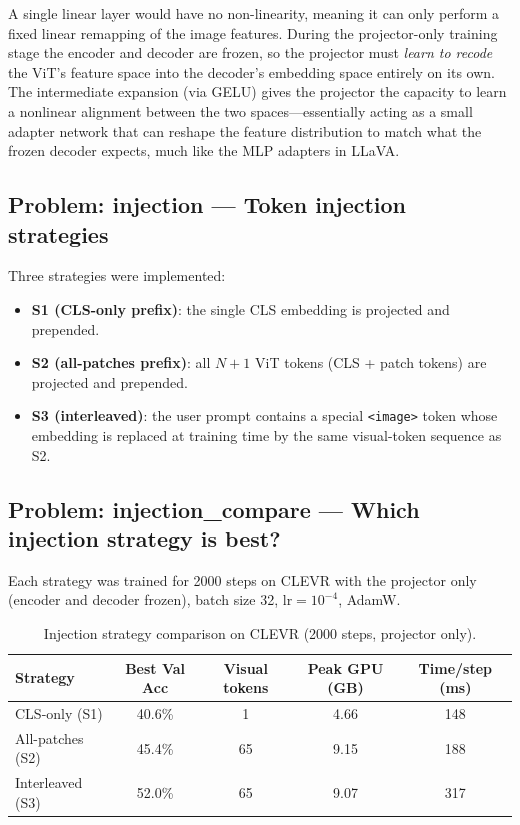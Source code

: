\documentclass[11pt]{article}
\begin{document}
A single linear layer would have no non-linearity, meaning it can only
perform a fixed linear remapping of the image features.  During the
projector-only training stage the encoder and decoder are frozen, so the
projector must \emph{learn to recode} the ViT's feature space into the
decoder's embedding space entirely on its own.  The intermediate expansion
(via GELU) gives the projector the capacity to learn a nonlinear alignment
between the two spaces---essentially acting as a small adapter network that
can reshape the feature distribution to match what the frozen decoder
expects, much like the MLP adapters in LLaVA.

\subsection*{Problem: injection --- Token injection strategies}

Three strategies were implemented:
\begin{itemize}[noitemsep]
  \item \textbf{S1 (CLS-only prefix)}: the single CLS embedding is projected
    and prepended.
  \item \textbf{S2 (all-patches prefix)}: all $N+1$ ViT tokens (CLS + patch
    tokens) are projected and prepended.
  \item \textbf{S3 (interleaved)}: the user prompt contains a special
    \texttt{<image>} token whose embedding is replaced at training time by
    the same visual-token sequence as S2.
\end{itemize}

\subsection*{Problem: injection\_compare --- Which injection strategy is best?}

Each strategy was trained for 2000 steps on CLEVR with the projector only
(encoder and decoder frozen), batch size 32, $\mathrm{lr}=10^{-4}$, AdamW.

\begin{table}[H]
\centering
\caption{Injection strategy comparison on CLEVR (2000 steps, projector only).}
\begin{tabular}{lcccc}
\toprule
Strategy & Best Val Acc & Visual tokens & Peak GPU (GB) & Time/step (ms) \\
\midrule
CLS-only (S1)    & 40.6\%  & 1  & 4.66  & 148 \\
All-patches (S2) & 45.4\%  & 65 & 9.15  & 188 \\
Interleaved (S3) & 52.0\%  & 65 & 9.07  & 317 \\
\bottomrule
\end{tabular}
\end{table}
\end{document}
